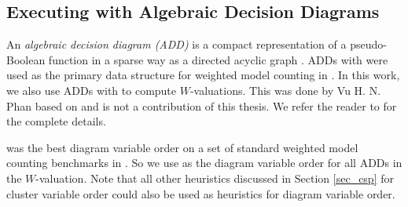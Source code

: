 \subsection{Executing with Algebraic Decision Diagrams}
An \emph{algebraic decision diagram (ADD)} is a compact representation of a pseudo-Boolean function in a sparse way as a directed acyclic graph \cite{bahar1997algebraic}.
ADDs with \cudd{} were used as the primary data structure for weighted model counting in \cite{DPV20}.
In this work, we also use ADDs with \cudd{} to compute $W$-valuations.
This was done by Vu H. N. Phan based on \cite{DPV20} and is not a contribution of this thesis. We refer the reader to \cite{dudek2020dpmc} for the complete details.

\Mcs{} was the best diagram variable order on a set of standard weighted model counting benchmarks in \cite{DPV20}.
So we use \Mcs{} as the diagram variable order for all ADDs in the $W$-valuation.
Note that all other heuristics discussed in Section \ref{sec_csp} for cluster variable order could also be used as heuristics for diagram variable order.

